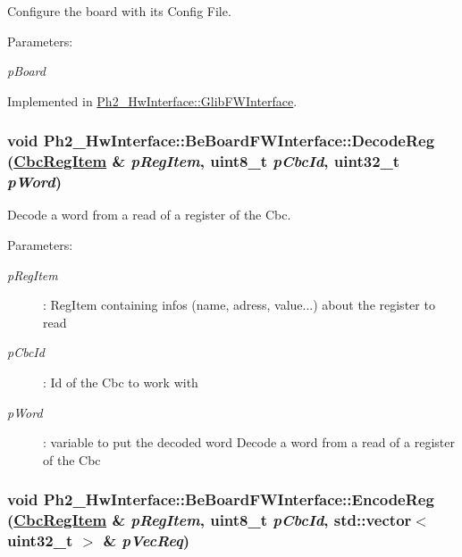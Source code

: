 Configure the board with its Config File. 

\begin{Desc}
\item[Parameters:]
\begin{description}
\item[{\em p\-Board}]\end{description}
\end{Desc}


Implemented in \hyperlink{class_ph2___hw_interface_1_1_glib_f_w_interface_52658cd813658d4fae48a79bdabaa5cc}{Ph2\_\-Hw\-Interface::Glib\-FWInterface}.\hypertarget{class_ph2___hw_interface_1_1_be_board_f_w_interface_d0bd156b59bcc266949b08ed87a35a00}{
\subsubsection[DecodeReg]{\setlength{\rightskip}{0pt plus 5cm}void Ph2\_\-Hw\-Interface::Be\-Board\-FWInterface::Decode\-Reg (\hyperlink{struct_ph2___hw_description_1_1_cbc_reg_item}{Cbc\-Reg\-Item} \& {\em p\-Reg\-Item}, uint8\_\-t {\em p\-Cbc\-Id}, uint32\_\-t {\em p\-Word})}}
\label{class_ph2___hw_interface_1_1_be_board_f_w_interface_d0bd156b59bcc266949b08ed87a35a00}


Decode a word from a read of a register of the Cbc. 

\begin{Desc}
\item[Parameters:]
\begin{description}
\item[{\em p\-Reg\-Item}]: Reg\-Item containing infos (name, adress, value...) about the register to read \item[{\em p\-Cbc\-Id}]: Id of the Cbc to work with \item[{\em p\-Word}]: variable to put the decoded word Decode a word from a read of a register of the Cbc \end{description}
\end{Desc}
\hypertarget{class_ph2___hw_interface_1_1_be_board_f_w_interface_094deaa5b40e98e2ea8f21c8e74c9431}{
\subsubsection[EncodeReg]{\setlength{\rightskip}{0pt plus 5cm}void Ph2\_\-Hw\-Interface::Be\-Board\-FWInterface::Encode\-Reg (\hyperlink{struct_ph2___hw_description_1_1_cbc_reg_item}{Cbc\-Reg\-Item} \& {\em p\-Reg\-Item}, uint8\_\-t {\em p\-Cbc\-Id}, std::vector$<$ uint32\_\-t $>$ \& {\em p\-Vec\-Req})}}
\label{class_ph2___hw_interface_1_1_be_board_f_w_interface_094deaa5b40e98e2ea8f21c8e74c9431}


